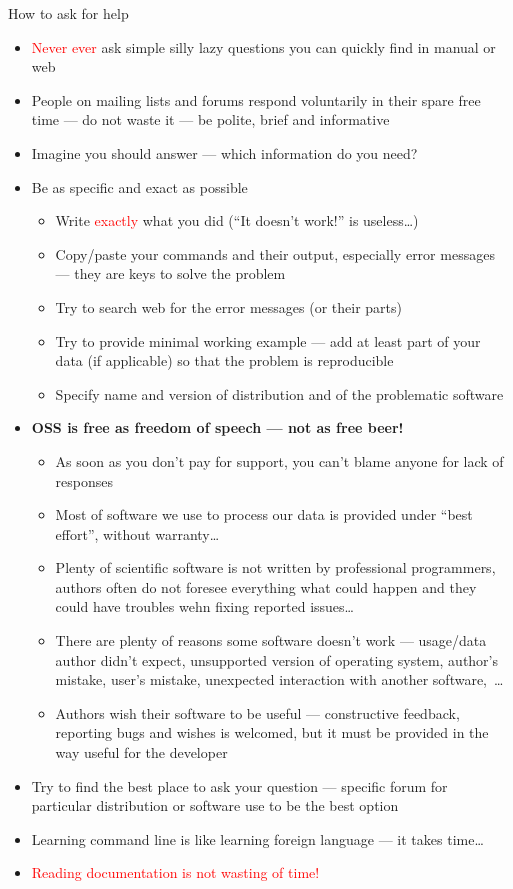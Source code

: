 \documentclass[compress, ucs, xelatex, 11pt, xcolor=svgnames, aspectratio=169,
	hyperref={
		bookmarks=true,
		unicode=true,
		colorlinks=true,
		pdftitle={Linux, command line and MetaCentrum},
		plainpages=false,
		pdfauthor={Vojtech Zeisek},
		pdfsubject={Course about use of Linux command line, writing shell scripts and using MetaCentrum of CESNET},
		pdfcreator={XeLaTeX},
		pdfkeywords={Linux, GNU, BASH, shell, command line, MetaCentrum},
		linkcolor=DarkRed, %
		anchorcolor=DarkBlue, %
		citecolor=Indigo, %
		filecolor=NavyBlue, %
		menucolor=DarkMagenta, %
		urlcolor=DarkBlue, %
		pdftex},
	url={hyphens, lowtilde} %
	]{beamer}
\renewcommand{\alert}[1]{\textcolor{red}{#1}}
\begin{document}
\begin{frame}[allowframebreaks]{How to ask for help}
	\label{howtoask}
	\begin{itemize}
		\item \alert{Never ever} ask simple silly lazy questions you can quickly find in manual or web
		\item People on mailing lists and forums respond voluntarily in their spare free time --- do not waste it --- be polite, brief and informative
		\item Imagine you should answer --- which information do you need?
		\item Be as specific and exact as possible
		\begin{itemize}
			\item Write \alert{exactly} what you did (\enquote{It doesn't work!} is useless\ldots)
			\item Copy/paste your commands and their output, especially error messages --- they are keys to solve the problem
			\item Try to search web for the error messages (or their parts)
			\item Try to provide minimal working example --- add at least part of your data (if applicable) so that the problem is reproducible
			\item Specify name and version of distribution and of the problematic software
		\end{itemize}
		\item \textbf{OSS is free as freedom of speech --- not as free beer!}
		\begin{itemize}
			\item As soon as you don't pay for support, you can't blame anyone for lack of responses
			\item Most of software we use to process our data is provided under \enquote{best effort}, without warranty\ldots
			\item Plenty of scientific software is not written by professional programmers, authors often do not foresee everything what could happen and they could have troubles wehn fixing reported issues\ldots
			\item There are plenty of reasons some software doesn't work --- usage/data author didn't expect, unsupported version of operating system, author's mistake, user's mistake, unexpected interaction with another software,~\ldots
			\item Authors wish their software to be useful --- constructive feedback, reporting bugs and wishes is welcomed, but it must be provided in the way useful for the developer
		\end{itemize}
		\item Try to find the best place to ask your question --- specific forum for particular distribution or software use to be the best option
		\item Learning command line is like learning foreign language --- it takes time\ldots
		\item \alert{Reading documentation is not wasting of time!}
	\end{itemize}
\end{frame}
\end{document}
